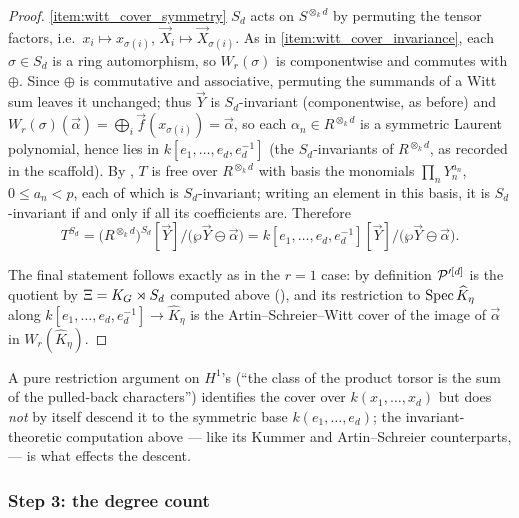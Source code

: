 \begin{proof}
    \ref{item:witt_cover_symmetry} $S_d$ acts on $S^{\otimes_k d}$ by permuting the
    tensor factors, i.e.\ $x_i \mapsto x_{\sigma(i)}$,
    $\vec X_i \mapsto \vec X_{\sigma(i)}$. As in
    \ref{item:witt_cover_invariance}, each $\sigma \in S_d$ is a ring automorphism,
    so $W_r(\sigma)$ is componentwise and commutes with $\oplus$. Since $\oplus$ is
    commutative and associative, permuting the summands of a Witt sum leaves it
    unchanged; thus $\vec Y$ is $S_d$-invariant (componentwise, as before) and
    $W_r(\sigma)(\vec \alpha) = \bigoplus_i \vec f(x_{\sigma(i)}) = \vec \alpha$, so
    each $\alpha_n \in R^{\otimes_k d}$ is a symmetric Laurent polynomial, hence lies
    in $k[e_1, \dots, e_d, e_d^{-1}]$ (the $S_d$-invariants of $R^{\otimes_k d}$, as
    recorded in the scaffold). By
    , $T$ is free over $R^{\otimes_k d}$ with basis the
    monomials $\prod_n Y_n^{a_n}$, $0 \leq a_n < p$, each of which is
    $S_d$-invariant; writing an element in this basis, it is $S_d$-invariant if and
    only if all its coefficients are. Therefore
    \[
    T^{S_d} = \bigl(R^{\otimes_k d}\bigr)^{S_d}[\vec Y]\big/\bigl(\wp \vec Y \ominus \vec \alpha\bigr)
    = k[e_1, \dots, e_d, e_d^{-1}][\vec Y]\big/\bigl(\wp \vec Y \ominus \vec \alpha\bigr).
    \]

    The final statement follows exactly as in the $r=1$ case: by definition
    $\mathcal{P}'^{[d]}$ is the quotient by $\Xi = K_{G} \rtimes S_d$ computed above
    (), and its restriction to $\operatorname{Spec} \widehat K_\eta$
    along $k[e_1, \dots, e_d, e_d^{-1}] \to \widehat K_\eta$ is the
    Artin--Schreier--Witt cover of the image of $\vec \alpha$ in
    $W_r(\widehat K_\eta)$.
\end{proof}

\begin{rem*}
    A pure restriction argument on $H^1$'s (``the
    class of the product torsor is the sum of the pulled-back characters'')
    identifies the cover over $k(x_1, \dots, x_d)$ but does \emph{not} by itself
    descend it to the symmetric base $k(e_1, \dots, e_d)$; the invariant-theoretic
    computation above --- like its Kummer and Artin--Schreier counterparts,
     --- is
    what effects the descent.
\end{rem*}

\subsubsection*{Step 3: the degree count}

